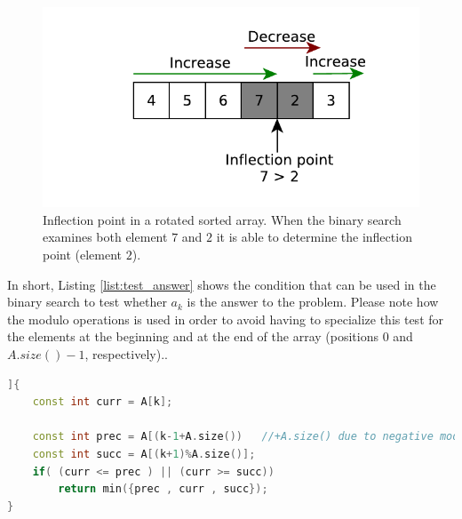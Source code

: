 \begin{figure}
	\centering
	\includegraphics{sources/min_rotated_array/images/inflection_point}
	\caption{Inflection point in a rotated sorted array. When the binary search examines both element $7$ and $2$ it is able to determine the inflection point (element $2$). }
	\label{fig:min_rotated_array:test_element}
\end{figure}

In short, Listing \ref{list:test_answer} shows the condition that can be used in the binary search to test whether $a_k$ is the answer to the problem. Please note how the modulo operations is used in order to avoid having to specialize this test for the elements at the beginning and at the end of the array (positions $0$ and $A.size()-1$, respectively).. 

\begin{lstlisting}[language=c++, caption={Test to verify whether the binary search can stop because an answer has been found.},label=list:test_answer]]{
	const int curr = A[k];

	const int prec = A[(k-1+A.size()) 	//+A.size() due to negative modulo
	const int succ = A[(k+1)%A.size()];
	if( (curr <= prec ) || (curr >= succ))
		return min({prec , curr , succ});
}
\end{lstlisting}

